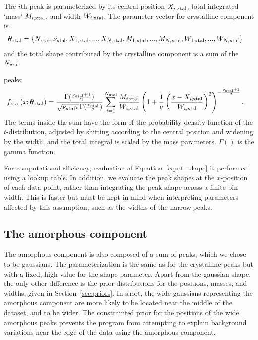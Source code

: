 \documentclass[review]{elsarticle}
\newcommand{\params}{\boldsymbol{\theta}}
\newcommand{\x}{x}
\newcommand{\changed}{\color{blue}}
\begin{document}
The $i$th peak is parameterized
by its central position $X_{i, \rm xtal}$,
{\changed total integrated `mass' $M_{i, \rm xtal}$}, and width $W_{i, \rm xtal}$.
The parameter vector for crystalline component is {\changed
\begin{align}
\params_{\rm xtal} &=
  \{N_{\rm xtal}, \nu_{\rm xtal}, X_{1, \rm xtal}, ..., X_{N, \rm xtal},
    M_{1, \rm xtal}, ..., M_{N, \rm xtal},
    W_{1, \rm xtal}, ..., W_{N, \rm xtal}\}
\end{align} } %
and the total shape contributed by the
crystalline component is a sum of the $N_{\rm xtal}$ {\changed peaks:
\begin{align}
f_{\rm xtal}(\x; \params_{\rm xtal}) &=
	\frac{\Gamma(\frac{\nu_{\rm xtal} + 1}{2})}{\sqrt{\nu_{\rm xtal}\pi}
                 		\Gamma(\frac{\nu_{\rm xtal}}{2})}
    \sum_{i=1}^{N_{\rm xtal}}
    		\frac{M_{i, \rm xtal}}
            	 {W_{i, \rm xtal}}
	\left(1 + \frac{1}{\nu}\left(\frac{x - X_{i, \rm xtal}}{W_{i, \rm xtal}}\right)^2\right)
    			^{-\frac{\nu_{\rm xtal} + 1}{2}}. \label{eqn:t_shape}
\end{align}
The terms inside the sum have the form of the probability density function
of the $t$-distribution, adjusted by shifting according to the central
position and widening by the width, and the total integral is scaled by
the mass parameters. $\Gamma()$ is the gamma function.

For computational efficiency, evaluation of Equation~\ref{eqn:t_shape}
is performed using a lookup table. In addition, we evaluate the peak
shapes at the $x$-position of each data point, rather than integrating
the peak shape across a finite bin width. This is faster but must be
kept in mind when interpreting parameters affected by this assumption,
such as the widths of the narrow peaks. } %

\subsection{The amorphous component}
The amorphous component is also composed of {\changed a sum of peaks, which we chose to be
gaussians. The parameterization is the same as for the crystalline peaks but with a fixed,
high value for the shape parameter.
Apart from the gaussian shape, the only other difference is the prior distributions for the positions, masses, and widths, given in Section~\ref{sec:priors}. In short, the wide gaussians representing the
amorphous component are more likely to be located near the middle of the
dataset, and to be wider.
The constrainted prior for the positions of the wide amorphous
peaks prevents the program from attempting to explain background
variations near the edge of the data using the amorphous component.}
\end{document}
